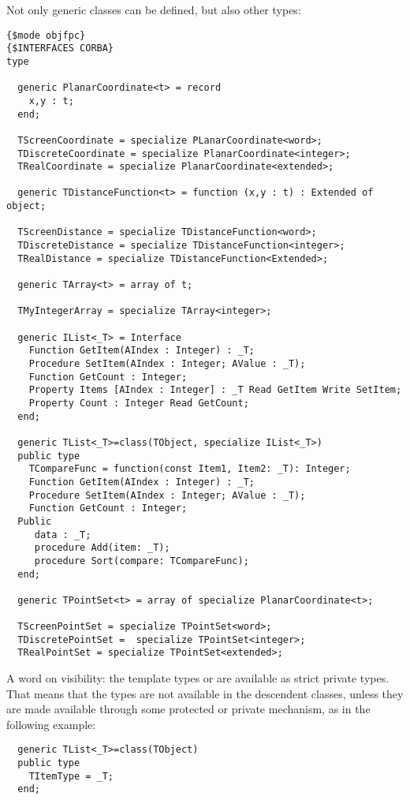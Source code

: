 Not only generic classes can be defined, but also other types:
\begin{verbatim}
{$mode objfpc}
{$INTERFACES CORBA}
type

  generic PlanarCoordinate<t> = record
    x,y : t;
  end;

  TScreenCoordinate = specialize PLanarCoordinate<word>;
  TDiscreteCoordinate = specialize PlanarCoordinate<integer>;
  TRealCoordinate = specialize PlanarCoordinate<extended>;

  generic TDistanceFunction<t> = function (x,y : t) : Extended of object;

  TScreenDistance = specialize TDistanceFunction<word>;
  TDiscreteDistance = specialize TDistanceFunction<integer>;
  TRealDistance = specialize TDistanceFunction<Extended>;

  generic TArray<t> = array of t;

  TMyIntegerArray = specialize TArray<integer>;

  generic IList<_T> = Interface
    Function GetItem(AIndex : Integer) : _T;
    Procedure SetItem(AIndex : Integer; AValue : _T);
    Function GetCount : Integer;
    Property Items [AIndex : Integer] : _T Read GetItem Write SetItem;
    Property Count : Integer Read GetCount;
  end;

  generic TList<_T>=class(TObject, specialize IList<_T>)
  public type
    TCompareFunc = function(const Item1, Item2: _T): Integer;
    Function GetItem(AIndex : Integer) : _T;
    Procedure SetItem(AIndex : Integer; AValue : _T);
    Function GetCount : Integer;
  Public
     data : _T;
     procedure Add(item: _T);
     procedure Sort(compare: TCompareFunc);
  end;

  generic TPointSet<t> = array of specialize PlanarCoordinate<t>;

  TScreenPointSet = specialize TPointSet<word>;
  TDiscretePointSet =  specialize TPointSet<integer>;
  TRealPointSet = specialize TPointSet<extended>;
\end{verbatim}

\begin{remark}
A word on visibility: the template types  or  are available as strict private types. 
That means that the types are not available in the descendent classes, unless they are made available 
through some protected or private mechanism, as in the following example:
\begin{verbatim}
  generic TList<_T>=class(TObject)
  public type
    TItemType = _T;
  end;
\end{verbatim}
\end{remark}

